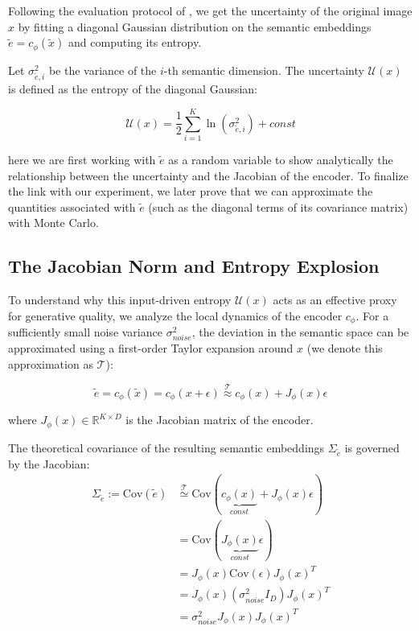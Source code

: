 Following the evaluation protocol of \cite{jazbec_generative_2025}, we get the uncertainty of the original image $x$ by fitting a diagonal Gaussian distribution on the semantic embeddings $\tilde{e} = c_\phi(\tilde{x})$ and computing its entropy. 

Let $\sigma_{\tilde{e},i}^2$ be the variance of the $i$-th semantic dimension. The uncertainty $\mathcal{U}(x)$ is defined as the entropy of the diagonal Gaussian:

\begin{equation}
\mathcal{U}(x) = \frac{1}{2} \sum_{i=1}^K \ln(\sigma_{\tilde{e},i}^2) + const
\end{equation}

\begin{tcolorbox}[colback=orange!10!white,colframe=orange!50!black,sharp corners]
\warning here we are first working with $\tilde{e}$ as a random variable to show analytically the relationship between the uncertainty and the Jacobian of the encoder. To finalize the link with our experiment, we later prove that we can approximate the quantities associated with $\tilde{e}$ (such as the diagonal terms of its covariance matrix) with Monte Carlo.
\end{tcolorbox}

\subsection{The Jacobian Norm and Entropy Explosion}

To understand why this input-driven entropy $\mathcal{U}(x)$ acts as an effective proxy for generative quality, we analyze the local dynamics of the encoder $c_\phi$. For a sufficiently small noise variance $\sigma_{noise}^2$, the deviation in the semantic space can be approximated using a first-order Taylor expansion around $x$ (we denote this approximation as $\mathcal{T}$):

\begin{equation}
\tilde{e} = c_\phi(\tilde{x})= c_\phi(x + \epsilon) \overset{\mathcal{T}}{\approx} c_\phi(x) + J_\phi(x)\epsilon
\end{equation}

where $J_\phi(x) \in \mathbb{R}^{K \times D}$ is the Jacobian matrix of the encoder. 

The theoretical covariance of the resulting semantic embeddings $\Sigma_{\tilde{e}}$ is governed by the Jacobian:
\begin{align}
    \Sigma_{\tilde{e}} := \text{Cov}(\tilde{e}) &\overset{\mathcal{T}}{\simeq} \text{Cov}(\underbrace{c_{\phi}(x)}_{const} + J_{\phi}(x)\epsilon) \nonumber \\
    &= \text{Cov}(\underbrace{J_\phi(x)}_{const}\epsilon) \nonumber \\
    &= J_{\phi}(x)\text{Cov}(\epsilon)J_{\phi}(x)^{T} \nonumber \\
    &= J_\phi(x) (\sigma_{noise}^2 I_D) J_\phi(x)^T \nonumber \\
    &= \sigma_{noise}^2 J_\phi(x) J_\phi(x)^T
\end{align}

